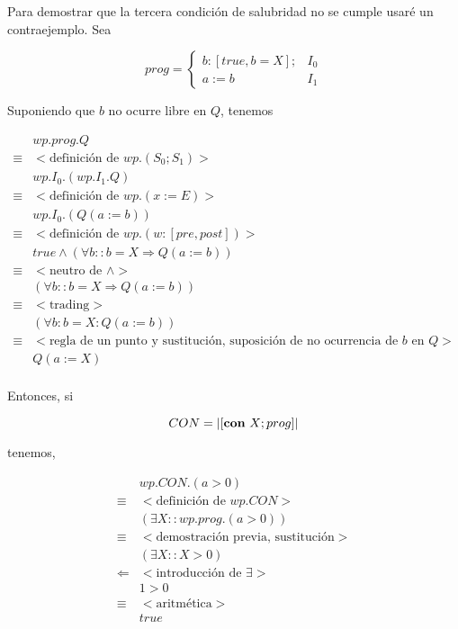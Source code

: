 \documentclass{article}
\begin{document}
\section{}

Para demostrar que la tercera condición de salubridad no se cumple usaré un
contraejemplo. Sea

$$
 prog = \left\{ \begin{array}{ll}
 b : [true, b=X] ; & I_0 \\
 a := b & I_1
 \end{array} \right.
$$

Suponiendo que $b$ no ocurre libre en $Q$, tenemos

\begin{align*}
 & wp.prog.Q \\
 \equiv & <\text{definición de } wp.(S_0 ; S_1)> \\
 & wp.I_0.(wp.I_1.Q) \\
 \equiv & <\text{definición de } wp.(x := E)> \\
 & wp.I_0.(Q(a := b)) \\
 \equiv & <\text{definición de } wp.(w : [pre, post])> \\
 & true \wedge (\forall b :: b = X \Rightarrow Q(a := b)) \\
 \equiv & <\text{neutro de } \wedge> \\
 & (\forall b :: b = X \Rightarrow Q(a := b)) \\
 \equiv & <\text{trading}> \\
 & (\forall b : b = X : Q(a := b)) \\
 \equiv & <\text{regla de un punto y sustitución, suposición de no ocurrencia de } b \text{ en } Q> \\
 & Q(a := X) \\
\end{align*}

Entonces, si

$$
CON = |[ \text{{\bf con} } X ; prog ]|
$$

tenemos,

\begin{align*}
 & wp.CON.(a > 0) \\
 \equiv & <\text{definición de } wp.CON> \\
 & (\exists X :: wp.prog.(a > 0)) \\
 \equiv & <\text{demostración previa, sustitución}> \\
 & (\exists X :: X > 0) \\
 \Leftarrow & <\text{introducción de } \exists> \\
 & 1 > 0 \\
 \equiv & <\text{aritmética}> \\
 & true \\
\end{align*}
\end{document}
